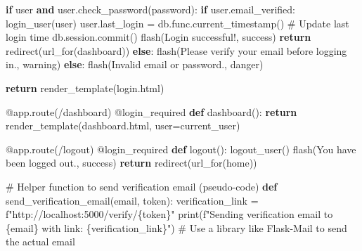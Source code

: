 \documentclass[
  letterpaper,
  DIV=11,
  numbers=noendperiod]{scrreprt}
\newenvironment{Shaded}{\begin{snugshade}}{\end{snugshade}}
\newcommand{\AttributeTok}[1]{\textcolor[rgb]{0.40,0.45,0.13}{#1}}
\newcommand{\BuiltInTok}[1]{\textcolor[rgb]{0.00,0.23,0.31}{#1}}
\newcommand{\CommentTok}[1]{\textcolor[rgb]{0.37,0.37,0.37}{#1}}
\newcommand{\ControlFlowTok}[1]{\textcolor[rgb]{0.00,0.23,0.31}{\textbf{#1}}}
\newcommand{\KeywordTok}[1]{\textcolor[rgb]{0.00,0.23,0.31}{\textbf{#1}}}
\newcommand{\NormalTok}[1]{\textcolor[rgb]{0.00,0.23,0.31}{#1}}
\newcommand{\OperatorTok}[1]{\textcolor[rgb]{0.37,0.37,0.37}{#1}}
\newcommand{\SpecialCharTok}[1]{\textcolor[rgb]{0.37,0.37,0.37}{#1}}
\newcommand{\SpecialStringTok}[1]{\textcolor[rgb]{0.13,0.47,0.30}{#1}}
\newcommand{\StringTok}[1]{\textcolor[rgb]{0.13,0.47,0.30}{#1}}
\begin{document}
\begin{Shaded}
\begin{Highlighting}[]
        \ControlFlowTok{if}\NormalTok{ user }\KeywordTok{and}\NormalTok{ user.check\_password(password):}
            \ControlFlowTok{if}\NormalTok{ user.email\_verified:}
\NormalTok{                login\_user(user)}
\NormalTok{                user.last\_login }\OperatorTok{=}\NormalTok{ db.func.current\_timestamp()  }\CommentTok{\# Update last login time}
\NormalTok{                db.session.commit()}
\NormalTok{                flash(}\StringTok{\textquotesingle{}Login successful!\textquotesingle{}}\NormalTok{, }\StringTok{\textquotesingle{}success\textquotesingle{}}\NormalTok{)}
                \ControlFlowTok{return}\NormalTok{ redirect(url\_for(}\StringTok{\textquotesingle{}dashboard\textquotesingle{}}\NormalTok{))}
            \ControlFlowTok{else}\NormalTok{:}
\NormalTok{                flash(}\StringTok{\textquotesingle{}Please verify your email before logging in.\textquotesingle{}}\NormalTok{, }\StringTok{\textquotesingle{}warning\textquotesingle{}}\NormalTok{)}
        \ControlFlowTok{else}\NormalTok{:}
\NormalTok{            flash(}\StringTok{\textquotesingle{}Invalid email or password.\textquotesingle{}}\NormalTok{, }\StringTok{\textquotesingle{}danger\textquotesingle{}}\NormalTok{)}

    \ControlFlowTok{return}\NormalTok{ render\_template(}\StringTok{\textquotesingle{}login.html\textquotesingle{}}\NormalTok{)}

\AttributeTok{@app.route}\NormalTok{(}\StringTok{\textquotesingle{}/dashboard\textquotesingle{}}\NormalTok{)}
\AttributeTok{@login\_required}
\KeywordTok{def}\NormalTok{ dashboard():}
    \ControlFlowTok{return}\NormalTok{ render\_template(}\StringTok{\textquotesingle{}dashboard.html\textquotesingle{}}\NormalTok{, user}\OperatorTok{=}\NormalTok{current\_user)}

\AttributeTok{@app.route}\NormalTok{(}\StringTok{\textquotesingle{}/logout\textquotesingle{}}\NormalTok{)}
\AttributeTok{@login\_required}
\KeywordTok{def}\NormalTok{ logout():}
\NormalTok{    logout\_user()}
\NormalTok{    flash(}\StringTok{\textquotesingle{}You have been logged out.\textquotesingle{}}\NormalTok{, }\StringTok{\textquotesingle{}success\textquotesingle{}}\NormalTok{)}
    \ControlFlowTok{return}\NormalTok{ redirect(url\_for(}\StringTok{\textquotesingle{}home\textquotesingle{}}\NormalTok{))}

\CommentTok{\# Helper function to send verification email (pseudo{-}code)}
\KeywordTok{def}\NormalTok{ send\_verification\_email(email, token):}
\NormalTok{    verification\_link }\OperatorTok{=} \SpecialStringTok{f"http://localhost:5000/verify/}\SpecialCharTok{\{}\NormalTok{token}\SpecialCharTok{\}}\SpecialStringTok{"}
    \BuiltInTok{print}\NormalTok{(}\SpecialStringTok{f"Sending verification email to }\SpecialCharTok{\{}\NormalTok{email}\SpecialCharTok{\}}\SpecialStringTok{ with link: }\SpecialCharTok{\{}\NormalTok{verification\_link}\SpecialCharTok{\}}\SpecialStringTok{"}\NormalTok{)}
    \CommentTok{\# Use a library like Flask{-}Mail to send the actual email}


\end{Highlighting}
\end{Shaded}
\end{document}
